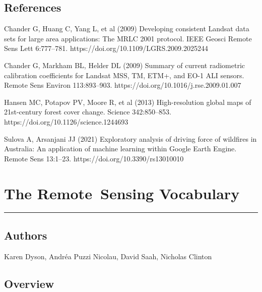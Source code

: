 \documentclass[
  letterpaper,
  DIV=11,
  numbers=noendperiod]{scrreprt}
\begin{document}
\hypertarget{references}{%
\section*{References}\label{references}}


Chander G, Huang C, Yang L, et al (2009) Developing consistent Landsat
data sets for large area applications: The MRLC 2001 protocol. IEEE
Geosci Remote Sens Lett 6:777--781.
https://doi.org/10.1109/LGRS.2009.2025244

Chander G, Markham BL, Helder DL (2009) Summary of current radiometric
calibration coefficients for Landsat MSS, TM, ETM+, and EO-1 ALI
sensors. Remote Sens Environ 113:893--903.
https://doi.org/10.1016/j.rse.2009.01.007

Hansen MC, Potapov PV, Moore R, et al (2013) High-resolution global maps
of 21st-century forest cover change. Science 342:850--853.
https://doi.org/10.1126/science.1244693

Sulova A, Arsanjani JJ (2021) Exploratory analysis of driving force of
wildfires in Australia: An application of machine learning within Google
Earth Engine. Remote Sens 13:1--23. https://doi.org/10.3390/rs13010010

\hypertarget{the-remote-sensing-vocabulary}{%
\chapter{The Remote~Sensing
Vocabulary}\label{the-remote-sensing-vocabulary}}

\begin{center}\rule{0.5\linewidth}{0.5pt}\end{center}

\hypertarget{authors-1}{%
\section*{Authors}\label{authors-1}}


Karen Dyson, Andréa Puzzi Nicolau, David Saah, Nicholas Clinton

\hypertarget{overview-3}{%
\section*{Overview}\label{overview-3}}

\end{document}
